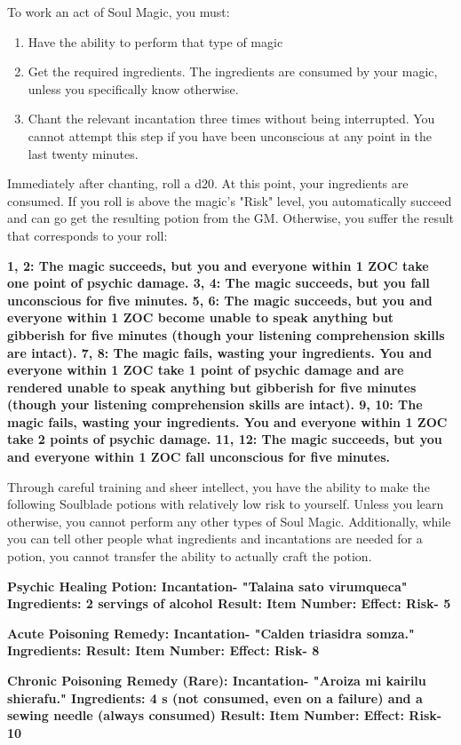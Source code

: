 \documentclass[green]{Kos}
\begin{document}
\name{\gWardSoulMagic{}}


To work an act of Soul Magic, you must:

\begin{enumerate} 
\item Have the ability to perform that type of magic
\item Get the required ingredients. The ingredients are consumed by your magic, unless you specifically know otherwise.
\item Chant the relevant incantation three times without being interrupted. You cannot attempt this step if you have been unconscious at any point in the last twenty minutes.
\end{enumerate}

Immediately after chanting, roll a d20. At this point, your ingredients are consumed. If you roll is above the magic's "Risk" level, you automatically succeed and can go get the resulting potion from the GM. Otherwise, you suffer the result that corresponds to your roll:

\bf{1, 2:} The magic succeeds, but you and everyone within 1 ZOC take one point of psychic damage.
\bf{3, 4:} The magic succeeds, but you fall unconscious for five minutes.
\bf{5, 6:} The magic succeeds, but you and everyone within 1 ZOC become unable to speak anything but gibberish for five minutes (though your listening comprehension skills are intact).
\bf{7, 8:} The magic fails, wasting your ingredients.  You and everyone within 1 ZOC take 1 point of psychic damage and are rendered unable to speak anything but gibberish for five minutes (though your listening comprehension skills are intact).
\bf{9, 10:} The magic fails, wasting your ingredients. You and everyone within 1 ZOC take 2 points of psychic damage.
\bf{11, 12:} The magic succeeds, but you and everyone within 1 ZOC fall unconscious for five minutes.

Through careful training and sheer intellect, you have the ability to make the following Soulblade potions with relatively low risk to yourself. Unless you learn otherwise, you cannot perform any other types of Soul Magic. Additionally, while you can tell other people what ingredients and incantations are needed for a potion, you cannot transfer the ability to actually craft the potion.

\bf{Psychic Healing Potion:}
Incantation- "Talaina sato virumqueca"
Ingredients: 2 servings of alcohol
Result: \iPsychicHealthRemedy{\MYname}
Item Number: \iPsychicHealthRemedy{\MYnumber}
Effect: \iPsychicHealthRemedy{\MYtext}
Risk- 5


\bf{Acute Poisoning Remedy:}
Incantation- "Calden triasidra somza."
Ingredients: \iHerbs{}
Result: \iAcutePoisonRemedy{\MYname}
Item Number: \iAcutePoisonRemedy{\MYnumber}
Effect: \iAcutePoisonRemedy{\MYtext}
Risk- 8

\bf{Chronic Poisoning Remedy (Rare):}
Incantation- "Aroiza mi kairilu shierafu."
Ingredients: 4 \iEmerald{\MYname}s (not consumed, even on a failure) and a sewing needle (always consumed)
Result: \iChronicPoisonRemedy{\MYname}
Item Number: \iChronicPoisonRemedy{\MYnumber}
Effect: \iChronicPoisonRemedy{\MYtext}
Risk- 10
\end{document}
